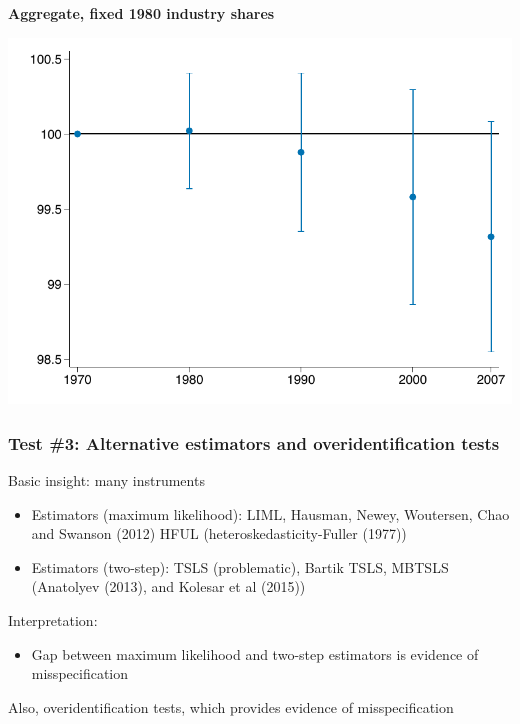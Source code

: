 \documentclass[notes,11pt, aspectratio=169]{beamer}
\begin{document}

\begin{frame}[label=aggregate_gr1980]
\addtocounter{framenumber}{-1}
\textbf{Aggregate, fixed 1980 industry shares}


\begin{center}
		\includegraphics[scale=0.73]{images/z_pre_trends_index1980.pdf}
\end{center}



\end{frame}




\begin{frame}[label=overidtest]
\frametitle{Test \#3: Alternative estimators and overidentification tests}

Basic insight: many instruments 
\begin{itemize}
\item Estimators (maximum likelihood): LIML, Hausman, Newey, Woutersen, Chao and Swanson (2012) HFUL (heteroskedasticity-Fuller (1977))
\item Estimators (two-step):  TSLS (problematic), Bartik TSLS, MBTSLS (Anatolyev (2013), and Kolesar et al (2015)) 
\end{itemize} 
Interpretation:
\begin{itemize}
\item Gap between maximum likelihood and two-step estimators is evidence of misspecification 
\end{itemize}
Also, overidentification tests, which provides evidence of misspecification
%



\end{frame}
\end{document}
